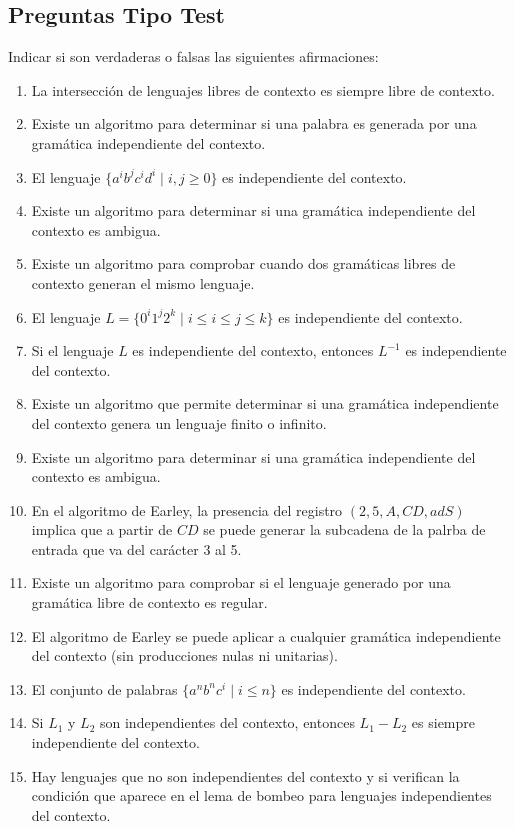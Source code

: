 \subsection{Preguntas Tipo Test}
Indicar si son verdaderas o falsas las siguientes afirmaciones:
\begin{enumerate}
    \item La intersección de lenguajes libres de contexto es siempre libre de contexto.
    \item Existe un algoritmo para determinar si una palabra es generada por una gramática independiente del contexto.
    \item El lenguaje $\{a^i b^j c^i d^i \mid i,j\geq 0\}$ es independiente del contexto.
    \item Existe un algoritmo para determinar si una gramática independiente del contexto es ambigua.
    \item Existe un algoritmo para comprobar cuando dos gramáticas libres de contexto generan el mismo lenguaje.
    \item El lenguaje $L = \{0^i 1^j 2^k \mid i\leq i \leq j \leq k\}$ es independiente del contexto.
    \item Si el lenguaje $L$ es independiente del contexto, entonces $L^{-1}$ es independiente del contexto.
    \item Existe un algoritmo que permite determinar si una gramática independiente del contexto genera un lenguaje finito o infinito.
    \item Existe un algoritmo para determinar si una gramática independiente del contexto es ambigua.
    \item En el algoritmo de Earley, la presencia del registro $(2,5,A,CD,adS)$ implica que a partir de $CD$ se puede generar la subcadena de la palrba de entrada que va del carácter 3 al 5.
    \item Existe un algoritmo para comprobar si el lenguaje generado por una gramática libre de contexto es regular.
    \item El algoritmo de Earley se puede aplicar a cualquier gramática independiente del contexto (sin producciones nulas ni unitarias).
    \item El conjunto de palabras $\{a^n b^n c^i \mid i\leq n\}$ es independiente del contexto.
    \item Si $L_1$ y $L_2$ son independientes del contexto, entonces $L_1-L_2$ es siempre independiente del contexto.
    \item Hay lenguajes que no son independientes del contexto y si verifican la condición que aparece en el lema de bombeo para lenguajes independientes del contexto.

\end{enumerate}
